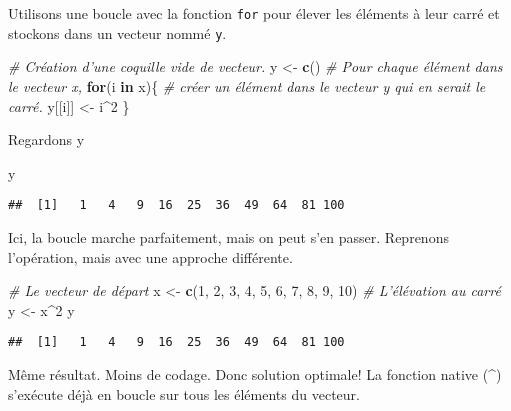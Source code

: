 \documentclass[]{book}
\newenvironment{Shaded}{\begin{snugshade}}{\end{snugshade}}
\newcommand{\KeywordTok}[1]{\textcolor[rgb]{0.13,0.29,0.53}{\textbf{#1}}}
\newcommand{\DecValTok}[1]{\textcolor[rgb]{0.00,0.00,0.81}{#1}}
\newcommand{\StringTok}[1]{\textcolor[rgb]{0.31,0.60,0.02}{#1}}
\newcommand{\CommentTok}[1]{\textcolor[rgb]{0.56,0.35,0.01}{\textit{#1}}}
\newcommand{\ControlFlowTok}[1]{\textcolor[rgb]{0.13,0.29,0.53}{\textbf{#1}}}
\newcommand{\OperatorTok}[1]{\textcolor[rgb]{0.81,0.36,0.00}{\textbf{#1}}}
\newcommand{\NormalTok}[1]{#1}
\begin{document}
Utilisons une boucle avec la fonction \texttt{for} pour élever les
éléments à leur carré et stockons dans un vecteur nommé \texttt{y}.

\begin{Shaded}
\begin{Highlighting}[]
\CommentTok{# Création d'une coquille vide de vecteur.}
\NormalTok{y <-}\StringTok{ }\KeywordTok{c}\NormalTok{() }
  \CommentTok{# Pour chaque élément dans le vecteur x,}
\ControlFlowTok{for}\NormalTok{(i }\ControlFlowTok{in}\NormalTok{ x)\{ }
  \CommentTok{# créer un élément dans le vecteur y qui en serait le carré.}
\NormalTok{  y[[i]] <-}\StringTok{ }\NormalTok{i}\OperatorTok{^}\DecValTok{2} 
\NormalTok{  \}}
\end{Highlighting}
\end{Shaded}

Regardons y

\begin{Shaded}
\begin{Highlighting}[]
\NormalTok{y}
\end{Highlighting}
\end{Shaded}

\begin{verbatim}
##  [1]   1   4   9  16  25  36  49  64  81 100
\end{verbatim}

Ici, la boucle marche parfaitement, mais on peut s'en passer. Reprenons
l'opération, mais avec une approche différente.

\begin{Shaded}
\begin{Highlighting}[]
\CommentTok{# Le vecteur de départ}
\NormalTok{x <-}\StringTok{ }\KeywordTok{c}\NormalTok{(}\DecValTok{1}\NormalTok{, }\DecValTok{2}\NormalTok{, }\DecValTok{3}\NormalTok{, }\DecValTok{4}\NormalTok{, }\DecValTok{5}\NormalTok{, }\DecValTok{6}\NormalTok{, }\DecValTok{7}\NormalTok{, }\DecValTok{8}\NormalTok{, }\DecValTok{9}\NormalTok{, }\DecValTok{10}\NormalTok{)}
\CommentTok{# L'élévation au carré}
\NormalTok{y <-}\StringTok{ }\NormalTok{x}\OperatorTok{^}\DecValTok{2}
\NormalTok{y}
\end{Highlighting}
\end{Shaded}

\begin{verbatim}
##  [1]   1   4   9  16  25  36  49  64  81 100
\end{verbatim}

Même résultat. Moins de codage. Donc solution optimale! La fonction
native (\^{}) s'exécute déjà en boucle sur tous les éléments du vecteur.
\end{document}

